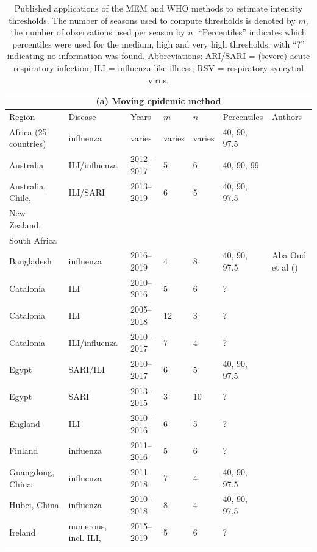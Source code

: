\documentclass{article}
\begin{document}
\begin{table}[h!]
\caption{\footnotesize Published applications of the MEM and WHO methods to estimate intensity thresholds. The number of seasons used to compute thresholds is denoted by $m$, the number of observations used per season by $n$. ``Percentiles'' indicates which percentiles were used for the medium, high and very high thresholds, with ``?'' indicating no information was found. Abbreviations: ARI/SARI = (severe) acute respiratory infection; ILI = influenza-like illness; RSV = respiratory syncytial virus.}
\label{tab:literature}
\center
\footnotesize
\begin{tabular}{l l l l l l l}
\multicolumn{7}{c}{(a) Moving epidemic method}\\
\toprule
Region & Disease & Years & $m$ & $n$ & Percentiles & Authors\\
\midrule
Africa (25 countries) & influenza & varies & varies & varies & 40, 90, 97.5 & \cite{Igboh2021} \\
Australia & ILI/influenza & 2012--2017 & 5 & 6 & 40, 90, 99 & \cite{Vette2018}\\
Australia, Chile, & ILI/SARI & 2013--2019 & 6 & 5 & 40, 90, 97.5 & \cite{Sullivan2019}\\
New Zealand,\\
South Africa\\
Bangladesh & influenza & 2016--2019 & 4 & 8 & 40, 90, 97.5 & Aba Oud et al (\citeyear{AbaOud2021})\\
Catalonia & ILI & 2010--2016 & 5 & 6 & ? & \cite{Basile2018}\\
Catalonia & ILI & 2005--2018 & 12 & 3 & ? & \cite{Basile2019}\\
Catalonia & ILI/influenza & 2010--2017 & 7 & 4 & ? & \cite{Torner2019}\\
Egypt & SARI/ILI & 2010--2017 & 6 & 5 & 40, 90, 97.5 & \cite{AbdElGawad2020}\\
Egypt & SARI & 2013--2015 & 3 & 10 & ? & \cite{Elhakim2019}\\
England & ILI & 2010--2016 & 6 & 5 & ? & \cite{Wagner2018}\\
Finland & influenza & 2011--2016 & 5 & 6 & ? & \cite{Pesaelae2019}\\
Guangdong, China & influenza & 2011-2018 & 7 & 4 & 40, 90, 97.5 & \cite{Kang2021} \\
Hubei, China & influenza & 2010--2018 & 8 & 4 & 40, 90, 97.5 & \cite{Jiang2022} \\
Ireland & numerous, incl. ILI, & 2015--2019 & 5 & 6 & ? & \cite{Domegan2022}\\

\end{tabular}
\end{table}
\end{document}
